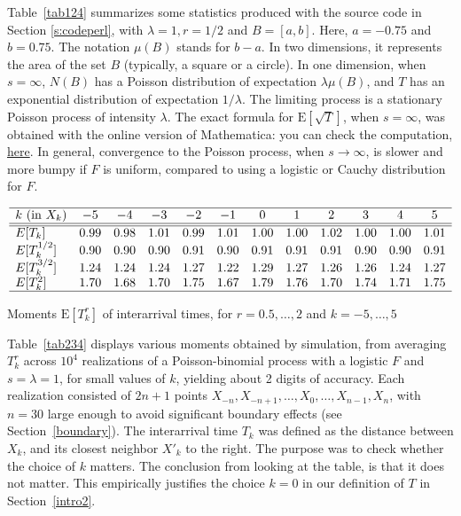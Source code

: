 \documentclass[10pt]{article}
\begin{document}
\noindent Table~\ref{tab124} summarizes some statistics produced with the source code in Section \ref{s:codeperl}, with $\lambda=1, r=1/2$ and $B=[a, b]$. Here, $a=-0.75$ and $b=0.75$. The notation $\mu(B)$ stands for $b-a$. In two dimensions, it represents the area of the set $B$ (typically, a square or a circle). In one dimension, when $s=\infty$, $N(B)$ has a Poisson distribution of expectation $\lambda\mu(B)$, and $T$ has an exponential distribution of expectation $1/\lambda$. The limiting process is a stationary Poisson process of intensity $\lambda$. The exact formula for $\mbox{E}[\sqrt{T}]$, when $s=\infty$, was obtained with the online version of Mathematica: you can check the computation, \href{https://bit.ly/30t354T}{here}. In general, convergence to the Poisson process, when $s\rightarrow\infty$, is slower and more bumpy if $F$ is uniform, compared to using a logistic or Cauchy distribution for $F$.

\begin{table}[H]
\[
\begin{array}{lccccccccccc}
\hline
k \mbox{ } (\mbox{in } X_k) & -5 &-4&-3 & -2&-1&0&1&2&3&4&5\\
\hline
\hline
E[T_k] & 0.99 &0.98&1.01 & 0.99&1.01&1.00&1.00&1.02&1.00&1.00&1.01\\
E[T_k^{1/2}] & 0.90 &0.90&0.90 & 0.91&0.90&0.91&0.91&0.91&0.90&0.90&0.91\\
E[T_k^{3/2}] & 1.24 &1.24&1.24 & 1.27&1.22&1.29&1.27&1.26&1.26&1.24&1.27\\
E[T_k^2] & 1.70 &1.68&1.70 & 1.75&1.67&1.79&1.76&1.70&1.74&1.71&1.75\\
\hline
\end{array}
\]
\caption{\label{tab234}Moments $\mbox{E}[T_k^r]$ of interarrival times, for $r=0.5,\dots,2$ and $k=-5,\dots,5$}
\end{table}

\noindent Table~\ref{tab234} displays various moments obtained by simulation, from averaging $T_k^r$ across $10^4$ realizations of a Poisson-binomial process with a logistic $F$ and $s=\lambda=1$, for small values of $k$, yielding about 2 digits of accuracy.
Each realization consisted of $2n+1$ points $X_{-n},X_{-n+1},\dots,X_0,\dots,X_{n-1},X_{n}$, with $n=30$ large enough to
avoid significant \textcolor{index}{boundary effects} (see Section~\ref{boundary}). The interarrival time $T_k$ was defined as the distance between $X_k$, and its closest neighbor $X'_k$ to the right.
The purpose was to check whether the choice of $k$ matters. The conclusion from looking at the table, is that it does not matter.
This empirically justifies the choice $k=0$  in our definition of $T$ in Section~\ref{intro2}.
\end{document}
